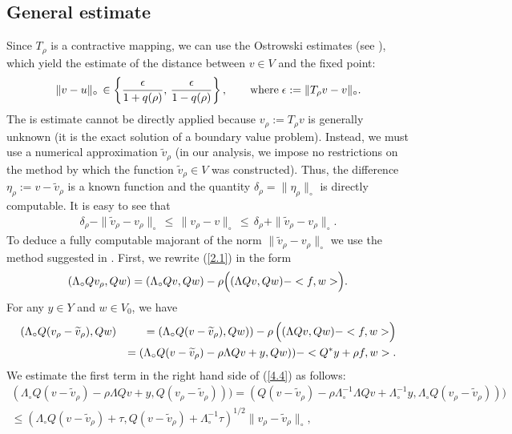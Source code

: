 \documentclass[amstex,amstext,amsfonts,epsf,12pt] {amsart}
\newcommand\ben{\begin{eqnarray}}
\newcommand\een{\end{eqnarray}}
\def\ben{\begin{eqnarray}}
\def\een{\end{eqnarray}}
\def\wt{\widetilde}
\begin{document}
\subsection{General estimate}
Since $T_\rho$ is a contractive mapping, we can use the Ostrowski estimates (see \cite{Ostrowski,Zeidler,ReGruyter}), which yield the estimate
of the distance between $v\in V$ and the fixed point:
\ben
\label{4.1}
\|v-u\|_\circ\,\in
\left\{\frac{\epsilon}{1+q(\rho)},\,\frac{\epsilon}{1-q(\rho)}
\right\},\qquad{\rm where}\;\epsilon:=\|T_\rho v-v\|_\circ.
\een
The is estimate cannot be directly applied because $v_\rho:=T_\rho v$ is
 generally unknown (it is the exact solution of a boundary value problem). 
 Instead, we must use a numerical approximation
$\wt v_\rho$ (in our analysis, we impose no restrictions
on the method by which the function $\wt v_\rho\in V$ was constructed).
Thus, the difference $\eta_\rho:=v-\wt v_\rho$ is a known function
and the quantity $\delta_\rho=\|\eta_\rho\|_\circ$ is directly computable. It is easy to see that
\ben
\label{4.2}
\delta_\rho -\|\wt v_\rho-v_\rho\|_\circ\,\leq\,\|v_\rho-v\|_\circ\,\leq\, \delta_\rho+\|\wt v_\rho-v_\rho\|_\circ.
\een
To deduce a fully computable
majorant of the norm $\|\wt v_\rho-v_\rho\|_\circ$ we use the method suggested
in \cite{Re2000,ReGruyter}.
First, we rewrite (\ref{2.1}) in the form
\ben
\label{4.3}
(\Lambda_\circ Q v_\rho, Qw)=(\Lambda_\circ Qv, Qw) - \rho \Bigl( (\Lambda Q v, Qw)-
<f,w>\Bigr) .%
\een
For any $y\in Y$ and $w\in V_0$, we have
\ben
\label{4.4}
&(\Lambda_\circ Q (v_\rho-\wt v_\rho), Qw)&=(\Lambda_\circ Q
( v -\wt v_\rho), Qw))-\rho\,\Bigl( (\Lambda Q v , Qw)-
<f,w>\Bigr)\\
&&=(\Lambda_\circ Q
( v -\wt v_\rho)-\rho\Lambda Q v +y, Qw))-<Q^*y+\rho f,w>. 
\nonumber
\een
We estimate the first term in the right hand side
of (\ref{4.4}) as follows:
\begin{multline*}
(\Lambda_\circ Q
( v -\wt v_\rho)-\rho\Lambda Q v +y, Q( v_\rho -\wt v_\rho)))=
(Q(v -\wt v_\rho)-\rho\Lambda^{-1}_\circ\Lambda Q v +\Lambda^{-1}_\circ y,\Lambda_\circ Q( v_\rho -\wt v_\rho)))\\
\leq 
\left(
\Lambda_\circ Q(v -\wt v_\rho)+\tau, 
Q(v -\wt v_\rho)+\Lambda^{-1}_\circ\tau\right)^{1/2}\|v_\rho -\wt v_\rho\|_\circ,
\end{multline*}
\end{document}
